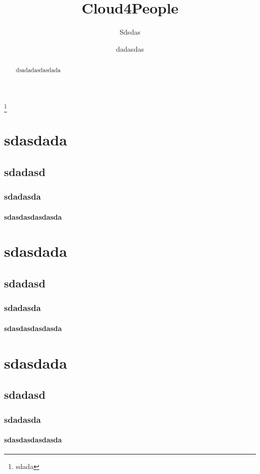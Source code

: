 \documentclass{./llncs2e/llncs}
\begin{document}
\title{Cloud4People}

\subtitle{Sdsdas}
\author{dadasdas}

\thanks{sdada}

\maketitle


\begin{abstract}
dsadadasdasdada
\end{abstract}



\section{sdasdada}
\subsection{sdadasd}
\subsubsection{sdadasda}
\paragraph{sdasdasdasdasda}


\section{sdasdada}
\subsection{sdadasd}
\subsubsection{sdadasda}
\paragraph{sdasdasdasdasda}

\section{sdasdada}
\subsection{sdadasd}
\subsubsection{sdadasda}
\paragraph{sdasdasdasdasda}
\end{document}
